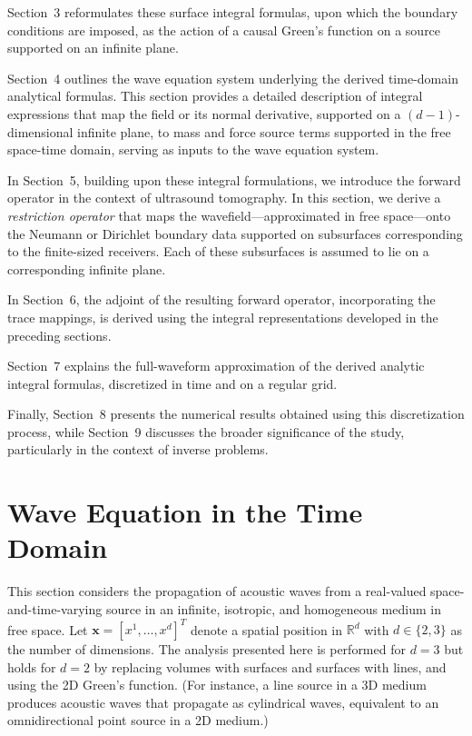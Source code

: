 \documentclass[11pt,reqno]{amsart}
\theoremstyle{remark}
\theoremstyle{italic_lemma}
\newcommand{\bx}{\boldsymbol{x}}
\begin{document}
Section~3 reformulates these surface integral formulas, upon which the 
boundary conditions are imposed, as the action of a causal Green's function 
on a source supported on an infinite plane.


Section~4 outlines the wave equation system underlying the derived time-domain analytical formulas. This section provides a detailed description of integral expressions that map the field or its normal derivative, supported on a $(d\!-\!1)$-dimensional infinite plane, to mass and force source terms supported in the free space-time domain, serving as inputs to the wave equation system.

In Section~5, building upon these integral formulations, we introduce the forward operator in the context of ultrasound tomography. In this section, we derive a \emph{restriction operator} that maps the wavefield—approximated in free space—onto the Neumann or Dirichlet boundary data supported on subsurfaces corresponding to the finite-sized receivers. Each of these subsurfaces is assumed to lie on a corresponding infinite plane. 

In Section~6, the adjoint of the resulting forward operator, incorporating the trace mappings, is derived using the integral representations developed in the preceding sections.

Section~7 explains the full-waveform approximation of the derived analytic integral formulas, discretized in time and on a regular grid.

Finally, Section~8 presents the numerical results obtained using this discretization process, while Section~9 discusses the broader significance of the study, particularly in the context of inverse problems.


\section{Wave Equation in the Time Domain }
\label{sec:wave-time}

\noindent
This section considers the propagation of acoustic waves from a real-valued space-and-time-varying source in an infinite, isotropic, and homogeneous medium in free space. Let $\bx = \left[x^1, \dots, x^d\right]^T$ denote a spatial position in $\mathbb{R}^d$ with $d \in \{2,3\}$ as the number of dimensions. The analysis presented here is performed for $d=3$ but holds for $d=2$ by replacing volumes with surfaces and surfaces with lines, and using the 2D Green's function. (For instance, a line source in a 3D medium produces acoustic waves that propagate as cylindrical waves, equivalent to an omnidirectional point source in a 2D medium.) 
\end{document}
